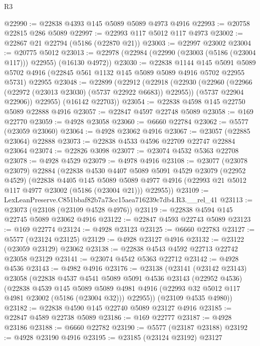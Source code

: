 \begin{lexlean}{R3}
\begin{coremodule}
@22990 := @22838 @4393 @145 @5089 @5089 @4973 @4916
@22993 := @20758 @22815 @286 @5089
@22997 := @22993 @117 @5012 @117 @4973
@23002 := @22867 @21 @22794 (@5186 (@22870 @21))
@23003 := @22997 @23002
@23004 := @20775 @5012
@23013 := @22978 (@22984 (@22990 (@23003 (@5186 (@23004 @117))) @22955) (@16130 @4972))
@23030 := @22838
    @1144
    @145
    @5091
    @5089
    @5702
    @4916
    (@22845 @561 @1132 @145 @5089 @5089 @4916 @5702 @22955 @5731)
    @22955
@23048 := @22899
    (@22912
      (@22918
        (@22930
          (@22960 (@22966 (@22972 (@23013 @23030) (@5737 @22922 @6683)) @22955))
          (@5737 @22904 @22906))
        @22955)
      (@16142 @22703))
@23054 := @22838 @4598 @145 @22750 @5089 @22888 @4916
@23057 := @22847 @4597 @22748 @5089
@23058 := @169 @22770
@23059 := @4928 @23058
@23060 := @6660 @22784
@23062 := @5577 (@23059 @23060)
@23064 := @4928 @23062 @4916
@23067 := @23057 (@22885 @23064) @22888
@23073 := @22838 @4533 @4596 @22709 @22747 @22884 @23064
@23074 := @22826 @3098
@23077 := @23074 @4532 @5363 @22708
@23078 := @4928 @4529
@23079 := @4978 @4916
@23108 := @23077
    (@23078 @23079)
    @22884
    (@22838
      @4530
      @4407
      @5089
      @5091
      @4529
      @23079
      (@22952 @4529)
      (@22838
        @4405
        @145
        @5089
        @5089
        @4977
        @4916
        (@22993 @21 @5012 @117 @4977 @23002 (@5186 (@23004 @21)))
        @22955))
@23109 := LexLeanPreserve.C851bbaf82b7a73cc15aea716239c7db4.R3.__rel_41
@23113 := @23073 (@23108 (@23109 @4528 @4976))
@23119 := @22838 @4594 @145 @22745 @5089 @23062 @4916
@23122 := @22847 @4593 @22743 @5089
@23123 := @169 @22774
@23124 := @4928 @23123
@23125 := @6660 @22783
@23127 := @5577 (@23124 @23125)
@23129 := @4928 @23127 @4916
@23132 := @23122 (@23059 @23129) @23062
@23138 := @22838 @4543 @4592 @22713 @22742 @23058 @23129
@23141 := @23074 @4542 @5363 @22712
@23142 := @4928 @4536
@23143 := @4982 @4916
@23176 := @23138
    (@23141
      (@23142 @23143)
      @23058
      (@22838
        @4537
        @4541
        @5089
        @5091
        @4536
        @23143
        (@22952 @4536)
        (@22838
          @4539
          @145
          @5089
          @5089
          @4981
          @4916
          (@22993 @32 @5012 @117 @4981 @23002 (@5186 (@23004 @32)))
          @22955))
      (@23109 @4535 @4980))
@23182 := @22838 @4590 @145 @22740 @5089 @23127 @4916
@23185 := @22847 @4589 @22738 @5089
@23186 := @169 @22777
@23187 := @4928 @23186
@23188 := @6660 @22782
@23190 := @5577 (@23187 @23188)
@23192 := @4928 @23190 @4916
@23195 := @23185 (@23124 @23192) @23127

\end{coremodule}
\end{lexlean}
